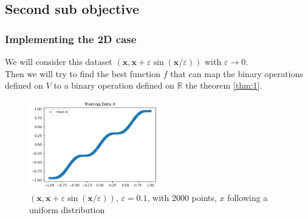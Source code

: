 \documentclass{beamer}
\begin{document}
    \subsection{Second sub objective}
    \begin{frame}

        \frametitle{Implementing the 2D case}


        We will consider this dataset 
        $(\mathbf{x}, \mathbf{x}+\varepsilon \sin (\mathbf{x} / \varepsilon))$ with $\varepsilon \rightarrow 0$.
        \\
        Then we will try to find the best function $f$ that can map the binary operations defined on $V$ to a binary operation defined on $\mathbb{R}$  the theorem \ref{thm:1}.
        \newpage
        \begin{figure}
            \centering
            \includegraphics[width=0.5\textwidth]{./images/M.png}
            \caption{$(\mathbf{x}, \mathbf{x}+\varepsilon \sin (\mathbf{x} / \varepsilon))$,  $\varepsilon = 0.1$, with 2000 points, $x$ following a uniform distribution}
            \label{fig:1}
        \end{figure}
        
    \end{frame}
\end{document}
